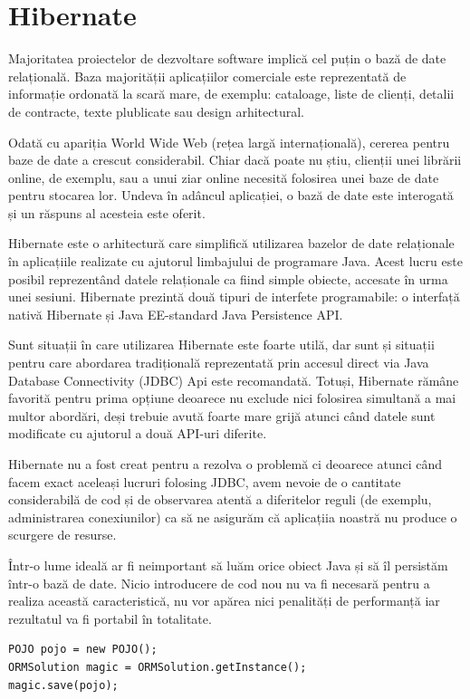 \documentclass[12pt]{book}
\begin{document}
\section{Hibernate}
Majoritatea proiectelor de dezvoltare software implică cel puțin o bază de date relațională. Baza majorității aplicațiilor comerciale este reprezentată de informație ordonată la scară mare, de exemplu: cataloage, liste de clienți, detalii de contracte, texte plublicate sau design arhitectural.

Odată cu apariția World Wide Web (rețea largă internațională), cererea pentru baze de date a crescut considerabil. Chiar dacă poate nu știu, clienții unei librării online, de exemplu, sau a unui ziar online necesită folosirea unei baze de date pentru stocarea lor. Undeva în adâncul aplicației, o bază de date este interogată și un răspuns al acesteia este oferit. 

Hibernate este o arhitectură care simplifică utilizarea bazelor de date relaționale în aplicațiile realizate cu ajutorul limbajului de programare Java. Acest lucru este posibil reprezentând datele relaționale ca fiind simple obiecte, accesate în urma unei sesiuni. Hibernate prezintă două tipuri de interfete programabile: o interfață nativă Hibernate și Java EE-standard Java Persistence API. 

Sunt situații în care utilizarea Hibernate este foarte utilă, dar sunt și situații pentru care abordarea tradițională reprezentată prin accesul direct via Java Database Connectivity (JDBC) Api este recomandată. Totuși, Hibernate rămâne favorită pentru prima opțiune deoarece nu exclude nici folosirea simultană a mai multor abordări, deși trebuie avută foarte mare grijă atunci când datele sunt modificate cu ajutorul a două API-uri diferite.

Hibernate nu a fost creat pentru a rezolva o problemă ci deoarece atunci când facem exact aceleași lucruri folosing JDBC, avem nevoie de o cantitate considerabilă de cod și de observarea atentă a diferitelor reguli (de exemplu, administrarea conexiunilor) ca să ne asigurăm că aplicațiia noastră nu produce o scurgere de resurse. 

Într-o lume ideală ar fi neimportant să luăm orice obiect Java și să îl persistăm într-o bază de date. Nicio introducere de cod nou nu va fi necesară pentru a realiza această caracteristică, nu vor apărea nici penalități de performanță iar rezultatul va fi portabil în totalitate.

\begin{lstlisting}[frame=single, caption=Persistarea unui obiect Java]
POJO pojo = new POJO();
ORMSolution magic = ORMSolution.getInstance();
magic.save(pojo);
\end{lstlisting}
\end{document}
